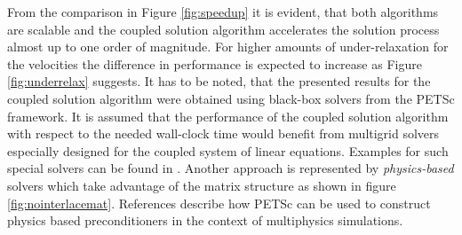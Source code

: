 From the comparison in Figure \ref{fig:speedup} it is evident, that both algorithms are scalable and the coupled solution algorithm accelerates the solution process almost up to one order of magnitude. For higher amounts of under-relaxation for the velocities the difference in performance is expected to increase as Figure \ref{fig:underrelax} suggests. It has to be noted, that the presented results for the coupled solution algorithm were obtained using black-box solvers from the PETSc framework. It is assumed that the performance of the coupled solution algorithm with respect to the needed wall-clock time would benefit from multigrid solvers especially designed for the coupled system of linear equations. Examples for such special solvers can be found in \cite{darwish09,klaij13,mangani14}. Another approach is represented by \emph{physics-based} solvers which take advantage of the matrix structure as shown in figure \ref{fig:nointerlacemat}. References \cite{brown12,mcinnes14} describe how PETSc can be used to construct physics based preconditioners in the context of multiphysics simulations.


